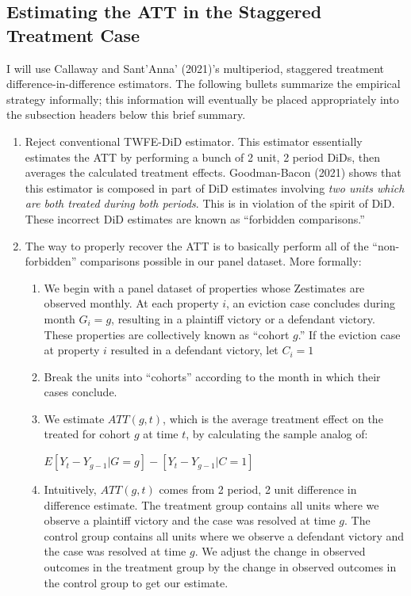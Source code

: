 \documentclass[12pt]{article}
\begin{document}
    \subsection{Estimating the ATT in the Staggered Treatment Case}
    I will use Callaway and Sant'Anna' (2021)'s multiperiod, staggered treatment difference-in-difference estimators. The following bullets summarize the empirical strategy informally; this information will eventually be placed appropriately into the subsection headers below this brief summary.
    \begin{enumerate}
        \item Reject conventional TWFE-DiD estimator. This estimator essentially estimates the ATT by performing a bunch of 2 unit, 2 period DiDs, then averages the calculated treatment effects. Goodman-Bacon (2021) shows that this estimator is composed in part of DiD estimates involving \emph{two units which are both treated during both periods}. This is in violation of the spirit of DiD. These incorrect DiD estimates are known as ``forbidden comparisons.''
        \item The way to properly recover the ATT is to basically perform all of the ``non-forbidden'' comparisons possible in our panel dataset. More formally:
        \begin{enumerate}
            \item We begin with a panel dataset of properties whose Zestimates are observed monthly. At each property $i$, an eviction case concludes during month $G_i=g$, resulting in a plaintiff victory or a defendant victory. These properties are collectively known as ``cohort $g$.'' If the eviction case at property $i$ resulted in a defendant victory, let $C_i=1$
            \item Break the units into ``cohorts'' according to the month in which their cases conclude. 
            \item We estimate $ATT(g, t)$, which is the average treatment effect on the treated for cohort $g$ at time $t$, by calculating the sample analog of:

            
            $E[Y_t - Y_{g-1}|G=g] - [Y_t - Y_{g-1}|C=1]$ 

            
            \item Intuitively, $ATT(g, t)$ comes from 2 period, 2 unit difference in difference estimate. The treatment group contains all units where we observe a plaintiff victory and the case was resolved at time $g$. The control group contains all units where we observe a defendant victory and the case was resolved at time $g$. We adjust the change in observed outcomes in the treatment group by the change in observed outcomes in the control group to get our estimate.
           

\end{enumerate}
\end{enumerate}
\end{document}
